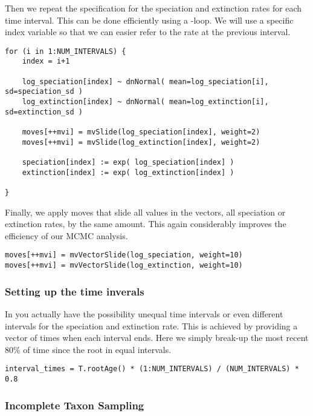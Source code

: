 Then we repeat the specification for the speciation and extinction rates for each time interval.
This can be done efficiently using a -loop.
We will use a specific index variable so that we can easier refer to the rate at the previous interval.
{\tt \begin{snugshade*}
\begin{lstlisting}
for (i in 1:NUM_INTERVALS) {
    index = i+1
    
    log_speciation[index] ~ dnNormal( mean=log_speciation[i], sd=speciation_sd )
    log_extinction[index] ~ dnNormal( mean=log_extinction[i], sd=extinction_sd )

    moves[++mvi] = mvSlide(log_speciation[index], weight=2)
    moves[++mvi] = mvSlide(log_extinction[index], weight=2)

    speciation[index] := exp( log_speciation[index] )
    extinction[index] := exp( log_extinction[index] )

}
\end{lstlisting}
\end{snugshade*}}
Finally, we apply moves that slide all values in the vectors, \IE all speciation or extinction rates, by the same amount. 
This again considerably improves the efficiency of our MCMC analysis.
{\tt \begin{snugshade*}
\begin{lstlisting}
moves[++mvi] = mvVectorSlide(log_speciation, weight=10)
moves[++mvi] = mvVectorSlide(log_extinction, weight=10)
\end{lstlisting}
\end{snugshade*}}


\subsubsection{Setting up the time inverals}
In \RevBayes you actually have the possibility unequal time intervals or even different intervals for the speciation and extinction rate.
This is achieved by providing a vector of times when each interval ends.
Here we simply break-up the most recent 80\% of time since the root in equal intervals.
{\tt \begin{snugshade*}
\begin{lstlisting}
interval_times = T.rootAge() * (1:NUM_INTERVALS) / (NUM_INTERVALS) * 0.8
\end{lstlisting}
\end{snugshade*}}


\subsubsection{Incomplete Taxon Sampling}

